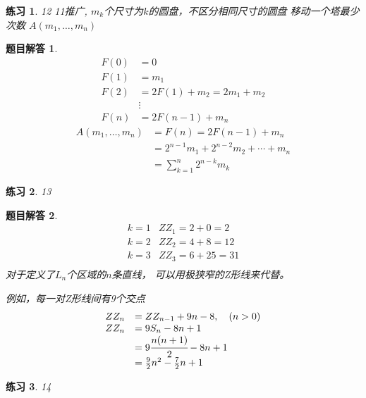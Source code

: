 \documentclass[mode=geye]{elegantnote}
\newtheorem{exercise}{练习}
\newtheorem{answer}{题目解答}
\begin{document}
\begin{exercise}
	12 11推广,	$ m_k $个尺寸为$ k $的圆盘，不区分相同尺寸的圆盘
	移动一个塔最少次数 $ A(m_1, \dots, m_n) $
\end{exercise}

\begin{answer}
	\begin{align*}
		F(0) 	&= 0	\\
		F(1) 	&= m_1	\\
		F(2) 	&= 2F(1)+m_2 = 2m_1+m_2	\\
				&\vdots	\\
		F(n)	&= 2F(n-1)+m_n
	\end{align*}
	\begin{align*}
		A(m_1, \dots, m_n) 
		&= F(n) = 2F(n-1)+m_n\\
		&= 2^{n-1}m_1+2^{n-2}m_2+\cdots+m_n\\
		&= \sum_{k=1}^{n} 2^{n-k} m_{k}
	\end{align*}
\end{answer}

\begin{exercise}
	13
\end{exercise}

\begin{answer}
	\begin{equation*}
		\begin{array}{ll}
			k=1 & ZZ_1 = 2+0 = 2\\
			k=2	& ZZ_2 = 4+8 = 12\\
			k=3	& ZZ_3 = 6+25 = 31\\
		\end{array}
	\end{equation*}
对于定义了$ L_n $个区域的$ n $条直线，
可以用极狭窄的Z形线来代替。

例如，每一对Z形线间有9个交点
\begin{equation}
	\begin{array}{ll}
		ZZ_n 	&= ZZ_{n-1}+9n-8,\quad (n>0)\\
		ZZ_n	&= 9S_n - 8n+1\\
				&= 9\cfrac{n(n+1)}{2} - 8n+1\\
				&= \frac{9}{2}n^2 - \frac{7}{2}n + 1\\
	\end{array}
\end{equation}
\end{answer}

\begin{exercise}
	14
\end{exercise}
\end{document}
